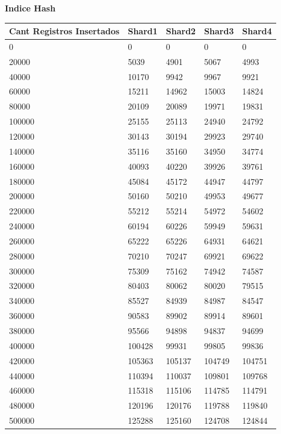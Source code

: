 \textbf{Indice Hash} \\
\begin{tabular}{ | l | l | l | l | l | }
\hline
	Cant Registros Insertados & Shard1 & Shard2 & Shard3 & Shard4 \\ \hline
	0 & 0 & 0 & 0 & 0 \\ \hline
	20000 & 5039 & 4901 & 5067 & 4993 \\ \hline
	40000 & 10170 & 9942 & 9967 & 9921 \\ \hline
	60000 & 15211 & 14962 & 15003 & 14824 \\ \hline
	80000 & 20109 & 20089 & 19971 & 19831 \\ \hline
	100000 & 25155 & 25113 & 24940 & 24792 \\ \hline
	120000 & 30143 & 30194 & 29923 & 29740 \\ \hline
	140000 & 35116 & 35160 & 34950 & 34774 \\ \hline
	160000 & 40093 & 40220 & 39926 & 39761 \\ \hline
	180000 & 45084 & 45172 & 44947 & 44797 \\ \hline
	200000 & 50160 & 50210 & 49953 & 49677 \\ \hline
	220000 & 55212 & 55214 & 54972 & 54602 \\ \hline
	240000 & 60194 & 60226 & 59949 & 59631 \\ \hline
	260000 & 65222 & 65226 & 64931 & 64621 \\ \hline
	280000 & 70210 & 70247 & 69921 & 69622 \\ \hline
	300000 & 75309 & 75162 & 74942 & 74587 \\ \hline
	320000 & 80403 & 80062 & 80020 & 79515 \\ \hline
	340000 & 85527 & 84939 & 84987 & 84547 \\ \hline
	360000 & 90583 & 89902 & 89914 & 89601 \\ \hline
	380000 & 95566 & 94898 & 94837 & 94699 \\ \hline
	400000 & 100428 & 99931 & 99805 & 99836 \\ \hline
	420000 & 105363 & 105137 & 104749 & 104751 \\ \hline
	440000 & 110394 & 110037 & 109801 & 109768 \\ \hline
	460000 & 115318 & 115106 & 114785 & 114791 \\ \hline
	480000 & 120196 & 120176 & 119788 & 119840 \\ \hline
	500000 & 125288 & 125160 & 124708 & 124844 \\ \hline
\end{tabular} \\
